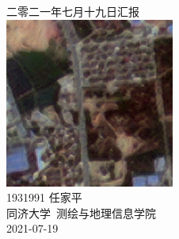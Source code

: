 \documentclass[a4paper, 12pt]{article}
\begin{document}
\begin{center}
    {\Huge 
        二零二一年七月十九日汇报}\\[20pt]
    
    \includegraphics[height=15em]{pic/cover.jpg} \\[15pt] 

    {\Large 
        1931991 任家平\\[12pt]
        同济大学~测绘与地理信息学院\\[12pt]
        2021-07-19}
\end{center}
\thispagestyle{empty}



\newpage
{}
\tableofcontents
\newpage
{}


\listoffigures
{}
\listoftables
{}
\newpage
\nocite{*}

% 
\end{document}

